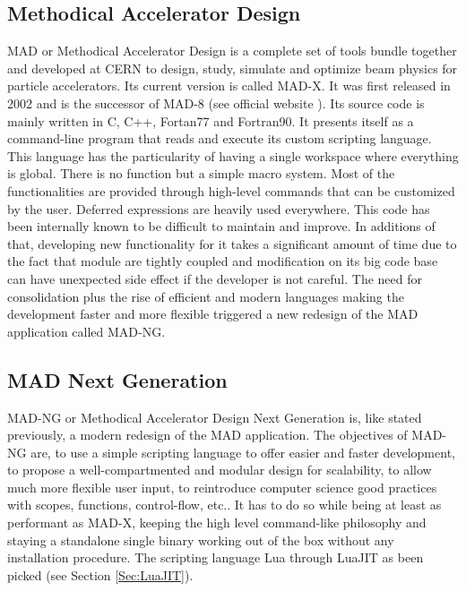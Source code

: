 

\subsection{Methodical Accelerator Design}
\label{Subsec:mad-orig}

MAD or Methodical Accelerator Design is a complete set of tools bundle together
and developed at CERN to design, study, simulate and optimize beam physics for
particle accelerators. Its current version is called MAD-X. It was first released
in 2002 and is the successor of  MAD-8 (see official website \cite{madx}).
Its source code is mainly written in C, C++, Fortan77 and Fortran90.
It presents itself as a command-line program that reads and execute its custom
scripting language. This language has the particularity of having a single
workspace where everything is global. There is no function but a simple macro
system. Most of the functionalities are provided through high-level commands that
can be customized by the user. Deferred expressions are heavily used everywhere.
This code has been internally known to
be difficult to maintain and improve. In additions of that, developing new
functionality for it takes a significant amount of time due to the fact that
module are tightly coupled and modification on its big code base can have
unexpected side effect if the developer is not careful. The need for
consolidation plus the rise of efficient and modern languages making the
development faster and more flexible triggered a new redesign of the MAD
application called MAD-NG.



\subsection{MAD Next Generation}
\label{Subsec:mad-ng}

MAD-NG or Methodical Accelerator Design Next Generation is, like stated previously,
a modern redesign of the MAD application. The objectives of MAD-NG are, to use
a simple scripting language to offer easier and faster development, to propose
a well-compartmented and modular design for scalability, to allow much more
flexible user input, to reintroduce computer science good practices with scopes,
functions, control-flow, etc.. It has to do so while being at least as performant
as MAD-X, keeping the high level command-like philosophy and staying a standalone
single binary working out of the box without any installation procedure.
The scripting language Lua through LuaJIT as been picked (see Section \ref{Sec:LuaJIT}).\\


